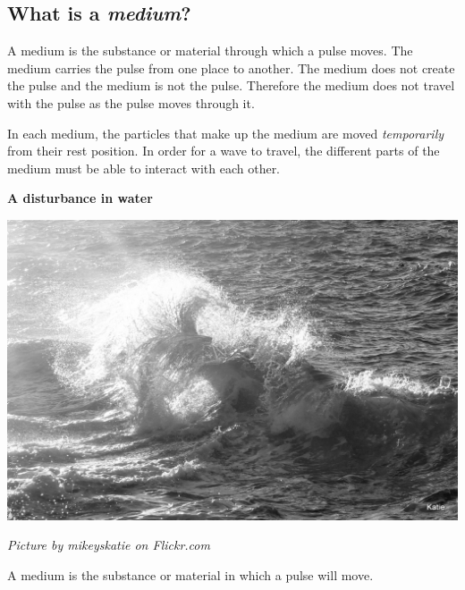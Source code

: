             \subsection*{What is a \textsl{medium}?}
            \nopagebreak
\begin{minipage}{.5\textwidth}
      \label{m38801*id312816}A medium is the substance or material through which a pulse moves. The medium carries the pulse from one place to another. The medium does not create the pulse and the medium is not the pulse. Therefore the medium does not travel with the pulse as the pulse moves through it. \par %
\label{m38801*id312841}In each medium, the particles that make up the medium are moved \textsl{temporarily} from their rest position. In order for a wave to travel, the different parts of the medium must be able to interact with each other.\par 

\end{minipage}
\begin{minipage}{.5\textwidth}
\begin{center}
\textbf{A disturbance in water}\par
 \includegraphics[width=.8\textwidth]{photos/waveby-mikeyskatie-flickr.jpg}\par
\textit{\small Picture by mikeyskatie on Flickr.com}
\end{center}
\end{minipage}


\label{m38801*fhsst!!!underscore!!!id51}


\pagebreak      
    \label{m38801*cid4}
 { \label{m38801*meaningfhsst!!!underscore!!!id51}
      \label{m38801*id312830}A medium is the substance or material in which a pulse will move. \par 
       } 
           

